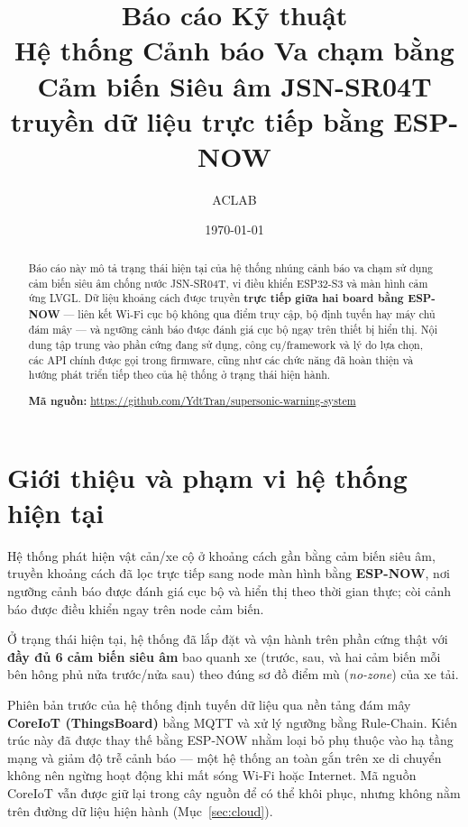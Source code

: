 \documentclass[a4paper,12pt]{article}
\title{\textbf{Báo cáo Kỹ thuật\\[4pt]
\large Hệ thống Cảnh báo Va chạm bằng Cảm biến Siêu âm JSN-SR04T\\
truyền dữ liệu trực tiếp bằng ESP-NOW}}
\author{ACLAB}
\date{\today}
\begin{document}
\maketitle

\begin{abstract}
\noindent
Báo cáo này mô tả trạng thái hiện tại của hệ thống nhúng cảnh báo va chạm sử dụng cảm biến siêu âm chống nước JSN-SR04T, vi điều khiển ESP32-S3 và màn hình cảm ứng LVGL. Dữ liệu khoảng cách được truyền \textbf{trực tiếp giữa hai board bằng ESP-NOW} — liên kết Wi-Fi cục bộ không qua điểm truy cập, bộ định tuyến hay máy chủ đám mây — và ngưỡng cảnh báo được đánh giá cục bộ ngay trên thiết bị hiển thị. Nội dung tập trung vào phần cứng đang sử dụng, công cụ/framework và lý do lựa chọn, các API chính được gọi trong firmware, cũng như các chức năng đã hoàn thiện và hướng phát triển tiếp theo của hệ thống ở trạng thái hiện hành.

\vspace{4pt}
\noindent\textbf{Mã nguồn:} \url{https://github.com/YdtTran/supersonic-warning-system}
\end{abstract}

\tableofcontents
\newpage

\section{Giới thiệu và phạm vi hệ thống hiện tại}

Hệ thống phát hiện vật cản/xe cộ ở khoảng cách gần bằng cảm biến siêu âm, truyền khoảng cách đã lọc trực tiếp sang node màn hình bằng \textbf{ESP-NOW}, nơi ngưỡng cảnh báo được đánh giá cục bộ và hiển thị theo thời gian thực; còi cảnh báo được điều khiển ngay trên node cảm biến.

Ở trạng thái hiện tại, hệ thống đã lắp đặt và vận hành trên phần cứng thật với \textbf{đầy đủ 6 cảm biến siêu âm} bao quanh xe (trước, sau, và hai cảm biến mỗi bên hông phủ nửa trước/nửa sau) theo đúng sơ đồ điểm mù (\emph{no-zone}) của xe tải.

Phiên bản trước của hệ thống định tuyến dữ liệu qua nền tảng đám mây \textbf{CoreIoT (ThingsBoard)} bằng MQTT và xử lý ngưỡng bằng Rule-Chain. Kiến trúc này đã được thay thế bằng ESP-NOW nhằm loại bỏ phụ thuộc vào hạ tầng mạng và giảm độ trễ cảnh báo — một hệ thống an toàn gắn trên xe di chuyển không nên ngừng hoạt động khi mất sóng Wi-Fi hoặc Internet. Mã nguồn CoreIoT vẫn được giữ lại trong cây nguồn để có thể khôi phục, nhưng không nằm trên đường dữ liệu hiện hành (Mục~\ref{sec:cloud}).
\end{document}
